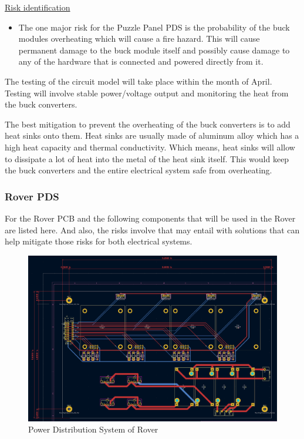 \documentclass[a4paper, 10pt]{article}
\begin{document}
		\underline{Risk identification}

		\begin{itemize}
		\item
		The one major risk for the Puzzle Panel PDS is the probability of the buck modules overheating which will cause a fire hazard. This will cause permanent damage to the buck module itself and possibly cause damage to any of the hardware that is connected and powered directly from it. 
		\end{itemize}

		The testing of the circuit model will take place within the month of April. Testing will involve stable power/voltage output and monitoring the heat from the buck converters.

		The best mitigation to prevent the overheating of the buck converters is to add heat sinks onto them. Heat sinks are usually made of aluminum alloy which has a high heat capacity and thermal conductivity. Which means, heat sinks will allow to dissipate a lot of heat into the metal of the heat sink itself. This would keep the buck converters and the entire electrical system safe from overheating.

 		\subsubsection*{Rover PDS}
 		For the Rover PCB and the following components that will be used in the Rover are listed here. And also, the risks involve that may entail with solutions that can help mitigate those risks for both electrical systems. 

		\begin{figure} [h]
			\centering
			\includegraphics[scale=0.2]{Photos/Rover PCB}
			\caption{Power Distribution System of Rover}
		\end{figure}
\end{document}
